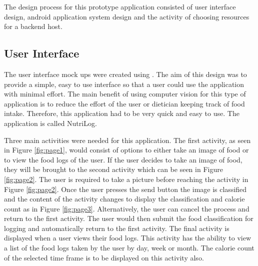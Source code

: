 The design process for this prototype application consisted of user interface design, android application system design and the activity of choosing resources for a backend host.

\subsection*{User Interface}
The user interface mock ups were created using \parencite{fluid}.
The aim of this design was to provide a simple, easy to use interface so that a user could use the application with minimal effort.
The main benefit of using computer vision for this type of application is to
reduce the effort of the user or dietician keeping track of food intake.
Therefore, this application had to be very quick and easy to use.
The application is called NutriLog.

Three main activities were needed for this application.
The first activity, as seen in Figure \ref{fig:page1}, would consist of options to either take an image of food or to view the food logs of the user.
If the user decides to take an image of food, they will be brought to the second activity which can be seen in Figure \ref{fig:page2}.
The user is required to take a picture before reaching the activity in Figure \ref{fig:page2}.
Once the user presses the send button the image is classified and the content of the activity changes to display the classification and calorie count as in Figure \ref{fig:page3}.
Alternatively, the user can cancel the process and return to the first activity.
The user would then submit the food classification for logging and automatically return to the first activity.
The final activity is displayed when a user views their food logs.
This activity has the ability to view a list of the food logs taken by the user by day, week or month.
The calorie count of the selected time frame is to be displayed on this activity also.


